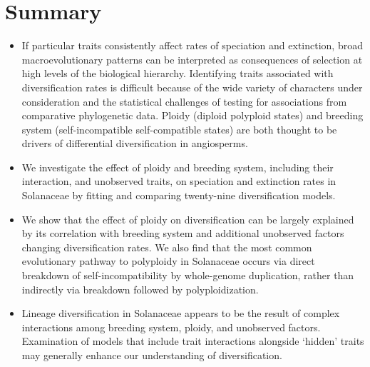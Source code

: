 \section{Summary}

\begin{itemize}
\item If particular traits consistently affect rates of speciation and extinction, broad macroevolutionary patterns can be interpreted as consequences of selection at high levels of the biological hierarchy.
Identifying traits associated with diversification rates is difficult because of the wide variety of characters under consideration and the statistical challenges of testing for associations from comparative phylogenetic data.
Ploidy (diploid \vs polyploid states) and breeding system (self-incompatible \vs self-compatible states) are both thought to be drivers of differential diversification in angiosperms. %

\item  We investigate the effect of ploidy and breeding system, including their interaction, and unobserved traits, on speciation and extinction rates in Solanaceae by fitting and comparing twenty-nine diversification models. %

\item We show that the effect of ploidy on diversification can be largely explained by its correlation with breeding system and additional unobserved factors changing diversification rates. %
We also find that the most common evolutionary pathway to polyploidy in Solanaceae occurs via direct breakdown of self-incompatibility by whole-genome duplication, rather than indirectly via breakdown followed by polyploidization.

\item  Lineage diversification in Solanaceae appears to be the result of complex interactions among breeding system, ploidy, and unobserved factors. 
Examination of models that include trait interactions alongside `hidden' traits may generally enhance our understanding of diversification.  %
\end{itemize}